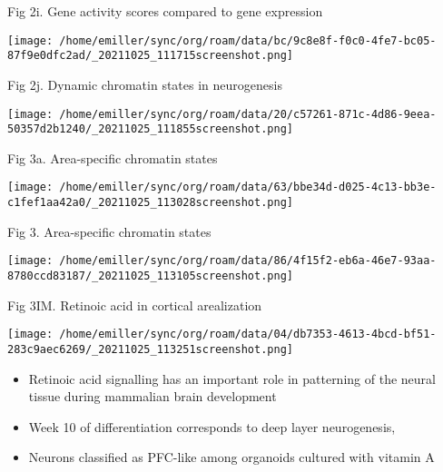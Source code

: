 \documentclass[bigger]{beamer}
\begin{document}
\begin{frame}[label={sec:orgda96ccf}]{Fig 2i. Gene activity scores compared to gene expression}
\begin{center}
\texttt{[image: /home/emiller/sync/org/roam/data/bc/9c8e8f-f0c0-4fe7-bc05-87f9e0dfc2ad/\_20211025\_111715screenshot.png]}
\end{center}
\end{frame}
\begin{frame}[label={sec:orga4f51ad}]{Fig 2j. Dynamic chromatin states in neurogenesis}
\begin{center}
\texttt{[image: /home/emiller/sync/org/roam/data/20/c57261-871c-4d86-9eea-50357d2b1240/\_20211025\_111855screenshot.png]}
\end{center}
\end{frame}

\begin{frame}[label={sec:org27abbc9}]{Fig 3a. Area-specific chromatin states}
\begin{center}
\texttt{[image: /home/emiller/sync/org/roam/data/63/bbe34d-d025-4c13-bb3e-c1fef1aa42a0/\_20211025\_113028screenshot.png]}
\end{center}
\end{frame}

\begin{frame}[label={sec:orgd4ca7e4}]{Fig 3. Area-specific chromatin states}
\begin{center}
\texttt{[image: /home/emiller/sync/org/roam/data/86/4f15f2-eb6a-46e7-93aa-8780ccd83187/\_20211025\_113105screenshot.png]}
\end{center}
\end{frame}

\begin{frame}[label={sec:org6b79ba6}]{Fig 3IM. Retinoic acid in cortical arealization}
\begin{center}
\texttt{[image: /home/emiller/sync/org/roam/data/04/db7353-4613-4bcd-bf51-283c9aec6269/\_20211025\_113251screenshot.png]}
\end{center}

\begin{itemize}
\item Retinoic acid signalling has an important role in patterning of the neural
tissue during mammalian brain development
\item Week 10 of differentiation corresponds to deep layer neurogenesis,
\item Neurons classified as PFC-like among organoids cultured with vitamin A
\end{itemize}
\end{frame}
\end{document}
